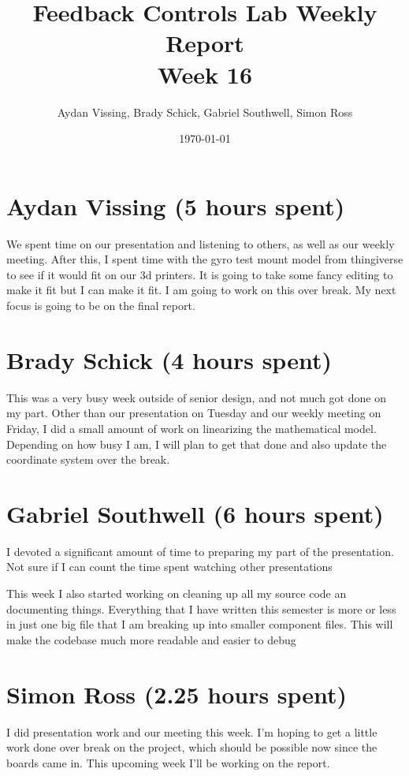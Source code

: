 \documentclass[12pt, titlepage]{article}
\title{Feedback Controls Lab Weekly Report \\ \normalsize{Week 16}}
\author{Aydan Vissing, Brady Schick, Gabriel Southwell, Simon Ross}
\date{\today}
\begin{document}
\maketitle

\section*{Aydan Vissing (5 hours spent)}

We spent time on our presentation and listening to others, as well as our weekly meeting. After this, I spent time with the gyro test mount model from thingiverse to see if it would fit on our 3d printers. It is going to take some fancy editing to make it fit but I can make it fit. I am going to work on this over break. My next focus is going to be on the final report. 

\section*{Brady Schick (4 hours spent)}

This was a very busy week outside of senior design, and not much got done on my part. Other than our presentation on Tuesday and our weekly meeting on Friday, I did a small amount of work on linearizing the mathematical model. Depending on how busy I am, I will plan to get that done and also update the coordinate system over the break.

\section*{Gabriel Southwell (6 hours spent)}

I devoted a significant amount of time to preparing my part of the presentation. Not sure if I can count the time spent watching other presentations

This week I also started working on cleaning up all my source code an documenting things. Everything that I have written this semester is more or less in just one big file that I am breaking up into smaller component files. This will make the codebase much more readable and easier to debug

\section*{Simon Ross (2.25 hours spent)}

I did presentation work and our meeting this week. I'm hoping to get a little work done over break on the project, which should be possible now since the boards came in. This upcoming week I'll be working on the report.
\end{document}

